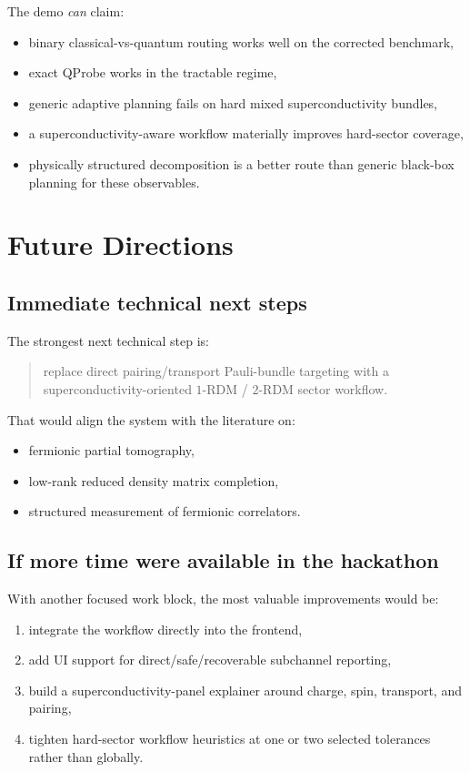 \documentclass[11pt]{article}
\begin{document}
The demo \emph{can} claim:

\begin{itemize}
\item binary classical-vs-quantum routing works well on the corrected benchmark,
\item exact QProbe works in the tractable regime,
\item generic adaptive planning fails on hard mixed superconductivity bundles,
\item a superconductivity-aware workflow materially improves hard-sector coverage,
\item physically structured decomposition is a better route than generic black-box planning for these observables.
\end{itemize}

\section{Future Directions}

\subsection{Immediate technical next steps}

The strongest next technical step is:

\begin{quote}
replace direct pairing/transport Pauli-bundle targeting with a superconductivity-oriented \(1\)-RDM / \(2\)-RDM sector workflow.
\end{quote}

That would align the system with the literature on:

\begin{itemize}
\item fermionic partial tomography,
\item low-rank reduced density matrix completion,
\item structured measurement of fermionic correlators.
\end{itemize}

\subsection{If more time were available in the hackathon}

With another focused work block, the most valuable improvements would be:

\begin{enumerate}[label=\arabic*.]
\item integrate the workflow directly into the frontend,
\item add UI support for direct/safe/recoverable subchannel reporting,
\item build a superconductivity-panel explainer around charge, spin, transport, and pairing,
\item tighten hard-sector workflow heuristics at one or two selected tolerances rather than globally.
\end{enumerate}
\end{document}
